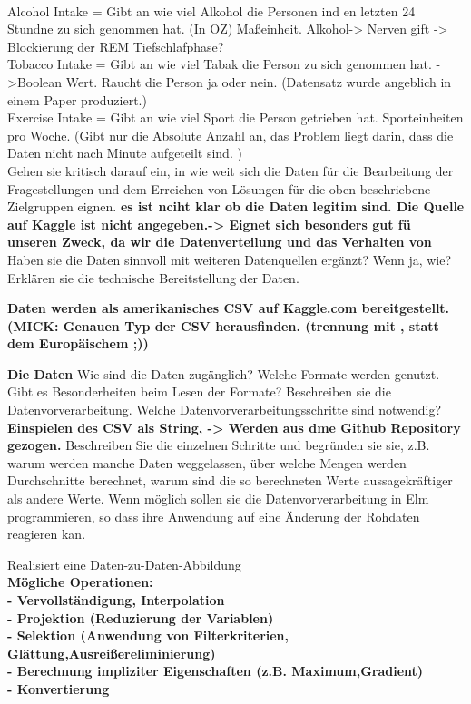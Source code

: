 \documentclass[usegeometry=true]{scrartcl}
\begin{document}
{\\ Alcohol Intake = Gibt an wie viel Alkohol die Personen ind en letzten 24 Stundne zu sich genommen hat. (In OZ)  Maßeinheit. Alkohol-> Nerven gift -> Blockierung der REM Tiefschlafphase? 
\\ Tobacco Intake = Gibt an wie viel Tabak die Person zu sich genommen hat. ->Boolean Wert. Raucht die Person ja oder nein. (Datensatz wurde angeblich in einem Paper produziert.)
\\ Exercise Intake = Gibt an wie viel Sport die Person getrieben hat. Sporteinheiten pro Woche. (Gibt nur die Absolute Anzahl an, das Problem liegt darin, dass die Daten nicht nach Minute aufgeteilt sind. ) \\ }
Gehen sie kritisch darauf ein, in wie weit sich die Daten für die Bearbeitung der Fragestellungen und dem Erreichen von Lösungen für die oben beschriebene Zielgruppen eignen.
\textbf{es ist nciht klar ob die Daten legitim sind. Die Quelle auf Kaggle ist nicht angegeben.-> 
Eignet sich besonders gut fü unseren Zweck, da wir die Datenverteilung und das Verhalten von }
 Haben sie die Daten sinnvoll mit weiteren Datenquellen ergänzt? Wenn ja, wie?
Erklären sie die technische Bereitstellung der Daten.

\textbf {Daten werden als amerikanisches CSV auf Kaggle.com bereitgestellt. (MICK: Genauen Typ der CSV herausfinden. (trennung mit , statt dem Europäischem ;))}

\textbf { Die Daten }
Wie sind die Daten zugänglich? Welche Formate werden genutzt. Gibt es Besonderheiten beim Lesen der Formate?
Beschreiben sie die Datenvorverarbeitung.
 Welche Datenvorverarbeitungsschritte sind notwendig?
 \textbf{ Einspielen des CSV als String, -> Werden aus dme Github Repository gezogen.  }
  Beschreiben Sie die einzelnen Schritte und begründen sie sie, z.B. warum werden manche Daten weggelassen, über welche Mengen werden Durchschnitte berechnet, warum sind die so berechneten Werte aussagekräftiger als andere Werte. Wenn möglich sollen sie die Datenvorverarbeitung in Elm programmieren, so dass ihre Anwendung auf eine Änderung der Rohdaten reagieren kan.
 
 
  Realisiert eine Daten-zu-Daten-Abbildung\\
 \textbf { Mögliche Operationen:\\
    - Vervollständigung, Interpolation\\
    - Projektion (Reduzierung der Variablen)\\
    - Selektion (Anwendung von Filterkriterien, Glättung,Ausreißereliminierung)\\
    - Berechnung impliziter Eigenschaften (z.B. Maximum,Gradient)\\
    - Konvertierung\\
    \\}
\end{document}
